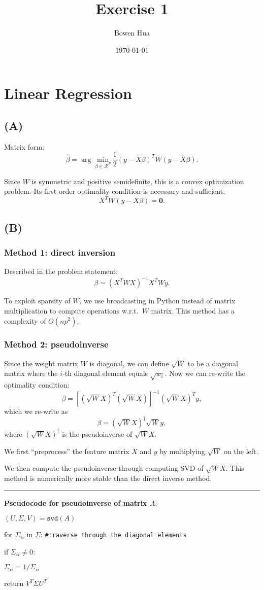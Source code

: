 \documentclass[a4paper,11pt]{article}
\begin{document}
\title{Exercise 1}
\author{Bowen Hua}
\date{\today}
\maketitle

\section{Linear Regression}
\subsection{(A)}
Matrix form:
$$
\hat{\beta} = \arg \min_{\beta \in \mathcal{R}^P} \frac{1}{2} (y - X \beta)^T W(y - X \beta).
$$

Since $W$ is symmetric and positive semidefinite, this is a convex optimization problem. Its first-order optimality condition is necessary and sufficient:
$$
X^TW(y - X\beta) = \bm{0}.
$$
\subsection{(B)}

\subsubsection{Method 1: direct inversion}

Described in the problem statement:
$$
\beta = (X^T W X)^{-1} X^T W y.
 $$

To exploit sparsity of $W$, we use broadcasting in Python instead of matrix multiplication to compute operations w.r.t.\ $W$ matrix. This method has a complexity of $O(np^2)$.
\subsubsection{Method 2: pseudoinverse}

Since the weight matrix $W$ is diagonal, we can define $\sqrt{W}$ to be a diagonal matrix where the $i$-th diagonal element equals $\sqrt{w_i}$. Now we can re-write the optimality condition:
$$
\beta  = [(\sqrt{W}X)^T  (\sqrt{W}X)]^{-1}  (\sqrt{W}X)^T y,
$$
which we re-write as
$$
\beta  = (\sqrt{W}X)^\dagger \sqrt{W} y,
$$
where $(\sqrt{W}X)^\dagger$ is the pseudoinverse of $\sqrt{W}X$.

We first ``preprocess'' the feature matrix $X$ and $y$ by multiplying $\sqrt{W}$ on the left. 

We then compute the pseudoinverse through computing SVD of $\sqrt{W}X$. This method is numerically more stable than the direct inverse method.
\newpage 
\noindent\rule{\textwidth}{1pt}
\textbf{Pseudocode for pseudoinverse of matrix $A$}:
\begin{adjustwidth}{1cm}{1cm}
{\parindent0pt
$(U,\Sigma,V) =\texttt{svd}(A)$

for $\Sigma_{ii}$ in $\Sigma$: \texttt{\#traverse through the diagonal elements}

\quad if $\Sigma_{ii} \neq 0$:
	
\quad \quad $\Sigma_{ii} = 1/\Sigma_{ii}$
		
return $V^T  \Sigma  U^T$}
\end{adjustwidth}	
\end{document}
